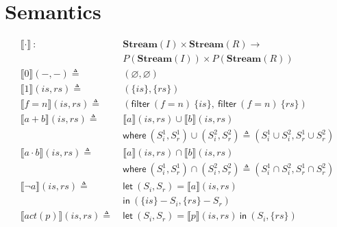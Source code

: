 \documentclass[12pt, letterpaper]{article}
\let\emptyset\varnothing
\newcommand\interp[1]{\llbracket #1 \rrbracket}
\begin{document}
\section{Semantics}
    \begin{align*}
        \interp{ \cdot }\ 
            :\ \ &
            \mathbf{Stream}(I)\times \mathbf{Stream}(R) \rightarrow \\
            & P(\mathbf{Stream}(I))\times P(\mathbf{Stream}(R)) 
            \\
        \interp{ 0 }(-, -)
            \triangleq\ &
            (\emptyset , \emptyset)
            \\ %
        \interp{ 1 }(\mathit{is}, \mathit{rs})
            \triangleq\ &
            (\{\mathit{is}\},\{\mathit{rs}\})
            \\
        \interp{ f=n }(\mathit{is}, \mathit{rs})
            \triangleq\ &
            (\mathsf{filter}\ (f=n)\ \{\mathit{is}\},\
             \mathsf{filter}\ (f=n)\ \{\mathit{rs}\}) 
            \\
        \interp{ a + b }(\mathit{is}, \mathit{rs})
            \triangleq\ &
            \interp { a }(\mathit{is}, \mathit{rs})\cup
            \interp { b }(\mathit{is}, \mathit{rs}) \\
            &\mathsf{where}\ (S_i^1, S_r^1)\cup (S_i^2, S_r^2)\triangleq
                (S_i^1\cup S_i^2, S_r^1\cup S_r^2)\\
        \interp { a \cdot b }(\mathit{is}, \mathit{rs})
            \triangleq\ &
            \interp { a }(\mathit{is}, \mathit{rs})\cap
            \interp { b }(\mathit{is}, \mathit{rs}) \\
            &\mathsf{where}\ (S_i^1, S_r^1)\cap (S_i^2, S_r^2)\triangleq
                (S_i^1\cap S_i^2, S_r^1\cap S_r^2)\\
        \interp { \neg a }(\mathit{is}, \mathit{rs})
            \triangleq\ &
            \mathsf{let}\ (S_i, S_r) = \interp {a}(\mathit{is}, \mathit{rs}) \\
            &\mathsf{in}\ (\{\mathit{is}\} - S_i, \{\mathit{rs}\} - S_r)
            \\
        \interp { act(p) }(\mathit{is}, \mathit{rs})
            \triangleq\ &
            \mathsf{let}\ (S_i,S_r) = \interp {p}(\mathit{is}, \mathit{rs})\ 
            \mathsf{in}\ (S_i, \{\mathit{rs}\})

\end{align*}
\end{document}
